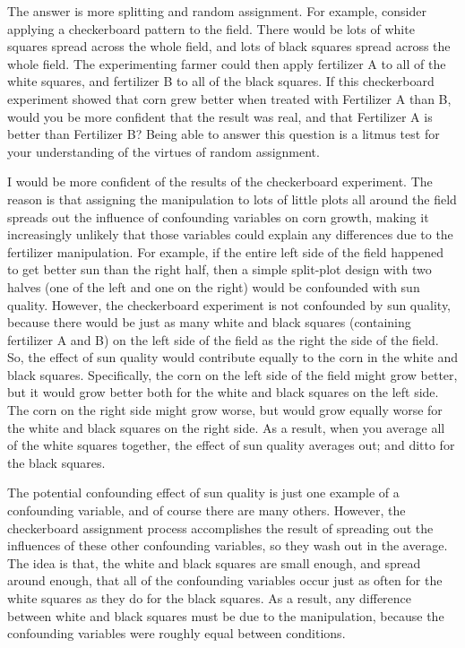 The answer is more splitting and random assignment. For example, consider applying a checkerboard pattern to the field. There would be lots of white squares spread across the whole field, and lots of black squares spread across the whole field. The experimenting farmer could then apply fertilizer A to all of the white squares, and fertilizer B to all of the black squares. If this checkerboard experiment showed that corn grew better when treated with Fertilizer A than B, would you be more confident that the result was real, and that Fertilizer A is better than Fertilizer B? Being able to answer this question is a litmus test for your understanding of the virtues of random assignment.

I would be more confident of the results of the checkerboard experiment. The reason is that assigning the manipulation to lots of little plots all around the field spreads out the influence of confounding variables on corn growth, making it increasingly unlikely that those variables could explain any differences due to the fertilizer manipulation. For example, if the entire left side of the field happened to get better sun than the right half, then a simple split-plot design with two halves (one of the left and one on the right) would be confounded with sun quality. However, the checkerboard experiment is not confounded by sun quality, because there would be just as many white and black squares (containing fertilizer A and B) on the left side of the field as the right the side of the field. So, the effect of sun quality would contribute equally to the corn in the white and black squares. Specifically, the corn on the left side of the field might grow better, but it would grow better both for the white and black squares on the left side. The corn on the right side might grow worse, but would grow equally worse for the white and black squares on the right side. As a result, when you average all of the white squares together, the effect of sun quality averages out; and ditto for the black squares.

The potential confounding effect of sun quality is just one example of a confounding variable, and of course there are many others. However, the checkerboard assignment process accomplishes the result of spreading out the influences of these other confounding variables, so they wash out in the average. The idea is that, the white and black squares are small enough, and spread around enough, that all of the confounding variables occur just as often for the white squares as they do for the black squares. As a result, any difference between white and black squares must be due to the manipulation, because the confounding variables were roughly equal between conditions.

